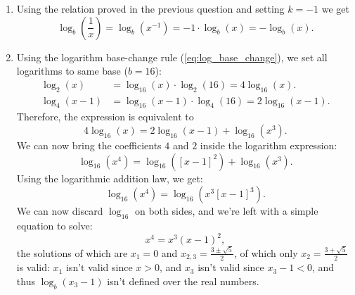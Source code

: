 \begin{enumerate}
	\item Using the relation proved in the previous question and setting $k=-1$ we get
		\[
			\log_{b} \left( \frac{1}{x} \right) = \log_{b} \left( x^{-1} \right) = -1\cdot\log_{b}(x) = -\log_{b}(x).
		\]

	\item Using the logarithm base-change rule (\autoref{eq:log_base_change}), we set all logarithms to same base ($b=16$):
		\begin{align*}
			\log_{2}(x) &= \log_{16}(x)\cdot\log_{2}(16) = 4\log_{16}(x).\\
			\log_{4}(x-1) &= \log_{16}(x-1)\cdot\log_{4}(16) = 2\log_{16}(x-1).
		\end{align*}
		Therefore, the expression is equivalent to
		\[
			4\log_{16}(x) = 2\log_{16}(x-1) + \log_{16}(x^{3}).
		\]
		We can now bring the coefficients $4$ and $2$ inside the logarithm expression:
		\[
			\log_{16}(x^{4}) = \log_{16}(\left[x-1\right]^{2}) + \log_{16}\left(x^{3}\right).
		\]
		Using the logarithmic addition law, we get:
		\[
			\log_{16}(x^{4}) = \log_{16}(x^{3}\left[x-1\right]^{3}).
		\]
		We can now discard $\log_{16}$ on both sides, and we're left with a simple equation to solve:
		\[
			x^{4} = x^{3} \left( x-1 \right)^{2},
		\]
		the solutions of which are $x_{1}=0$ and $x_{2,3}=\frac{3\pm\sqrt{5}}{2}$, of which only $x_{2} = \frac{3+\sqrt{5}}{2}$ is valid: $x_{1}$ isn't valid since $x>0$, and $x_{3}$ isn't valid since $x_{3}-1<0$, and thus $\log_{b}\left(x_{3}-1\right)$ isn't defined over the real numbers.
\end{enumerate}
